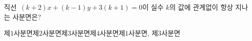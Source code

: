 직선~$(k+2)x+(k-1)y+3(k+1)=0$이 실수 $k$의 값에 관계없이 항상 지나는 사분면은?
\begin{choicesii}{제$1$사분면}{제$2$사분면}{제$3$사분면}{제$4$사분면}{제$1$사분면, 제$3$사분면}\end{choicesii}
